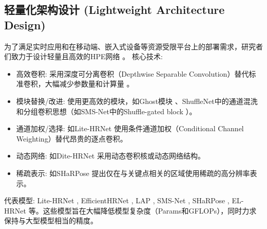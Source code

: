 \documentclass[12pt,a4paper]{article}
\begin{document}
\subsection{轻量化架构设计 (Lightweight Architecture Design)}
为了满足实时应用和在移动端、嵌入式设备等资源受限平台上的部署需求，研究者们致力于设计轻量且高效的HPE网络 \cite{Liu2020SMSNet}。
核心技术:
\begin{itemize}
    \item 高效卷积: 采用深度可分离卷积（Depthwise Separable Convolution）替代标准卷积，大幅减少参数量和计算量 \cite{Wang2021HRNetTPAMI}。
    \item 模块替换/改进: 使用更高效的模块，如Ghost模块 \cite{Han2020GhostNet}、ShuffleNet中的通道混洗和分组卷积思想（如SMS-Net中的Shuffle-gated block \cite{Liu2020SMSNet}）。
    \item 通道加权/选择: 如Lite-HRNet \cite{Sun2019HRNet} 使用条件通道加权（Conditional Channel Weighting）替代昂贵的逐点卷积。
    \item 动态网络: 如Dite-HRNet \cite{Sun2019HRNet} 采用动态卷积核或动态网络结构。
    \item 稀疏表示: 如SHaRPose \cite{Sun2023SHaRPose} 提出仅在与关键点相关的区域使用稀疏的高分辨率表示。
\end{itemize}
代表模型: Lite-HRNet \cite{Sun2019HRNet}, EfficientHRNet \cite{Wang2020EfficientHRNet}, LAP \cite{Zhang2020LAPNet}, SMS-Net \cite{Liu2020SMSNet}, SHaRPose \cite{Sun2023SHaRPose}, EL-HRNet \cite{Wang2022ELHRNet} 等。这些模型旨在大幅降低模型复杂度（Params和GFLOPs），同时力求保持与大型模型相当的精度。
\end{document}
